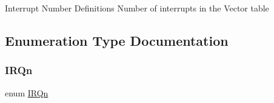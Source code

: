 Interrupt Number Definitions Number of interrupts in the Vector table 

\subsection{Enumeration Type Documentation}
\mbox{\label{group___interrupt__vector__numbers_ga666eb0caeb12ec0e281415592ae89083}} 
\subsubsection{\texorpdfstring{IRQn}{IRQn}}
{\footnotesize\ttfamily enum \mbox{\hyperlink{group___interrupt__vector__numbers_ga666eb0caeb12ec0e281415592ae89083}{I\+R\+Qn}}}

